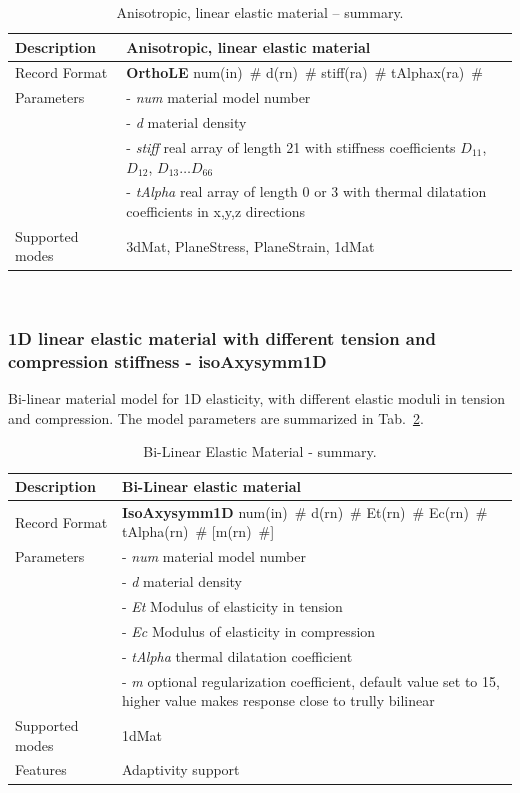\documentclass[a4paper]{article}
\newcommand{\descitem}[1]{{\noindent \bf #1}}
\newcommand{\elemparam}[2]{{{#1\tiny (#2)}~\#}}
\newcommand{\param}[1]{{\it #1}}
\newenvironment{mmt}{\begin{tabular}{|l|p{9cm}|}}{\end{tabular}\\}
\newenvironment{mmt}{\begin{tabular}{|l|l|}}{\end{tabular}\\}
\begin{document}
\begin{table}[!htb]
\begin{mmt}
\hline
Description & Anisotropic, linear elastic material\\
\hline
Record Format & \descitem{OrthoLE} \elemparam{num}{in}
\elemparam{d}{rn} \elemparam{stiff}{ra} \elemparam{tAlphax}{ra} \\
Parameters &- \param{num} material model number\\
&- \param{d} material density\\
&- \param{stiff} real array of length 21 with stiffness coefficients $D_{11}$, $D_{12}$, $D_{13}\ldots D_{66}$ \\
&- \param{tAlpha} real array of length 0 or 3 with thermal
dilatation coefficients in x,y,z directions\\
Supported modes& 3dMat, PlaneStress, PlaneStrain, 1dMat\\
\hline
\end{mmt}
\caption{Anisotropic, linear elastic material -- summary.}
\label{AnisoLE_table}
\end{table}

\subsubsection{1D linear elastic material with different tension and compression stiffness - isoAxysymm1D}
\label{isoaxysymm1d}
Bi-linear material model for 1D elasticity, with different elastic moduli in tension and compression. The model parameters are summarized
in Tab.~\ref{isoaxysymm1d_table}.

\begin{table}[!htb]
\begin{mmt}
\hline
Description & Bi-Linear elastic material\\
\hline
Record Format & \descitem{IsoAxysymm1D} \elemparam{num}{in}
\elemparam{d}{rn} \elemparam{Et}{rn} \elemparam{Ec}{rn}
\elemparam{tAlpha}{rn} [\elemparam{m}{rn}]\\
Parameters &- \param{num} material model number\\
&- \param{d} material density\\
&- \param{Et} Modulus of elasticity in tension\\
&- \param{Ec} Modulus of elasticity in compression\\
&- \param{tAlpha} thermal dilatation coefficient\\
&- \param{m} optional regularization coefficient, default value set to 15, higher value makes response close to trully bilinear\\
Supported modes& 1dMat\\
Features & Adaptivity support\\
\hline
\end{mmt}
\caption{Bi-Linear Elastic Material - summary.}
\label{isoaxysymm1d_table}
\end{table}
\end{document}
